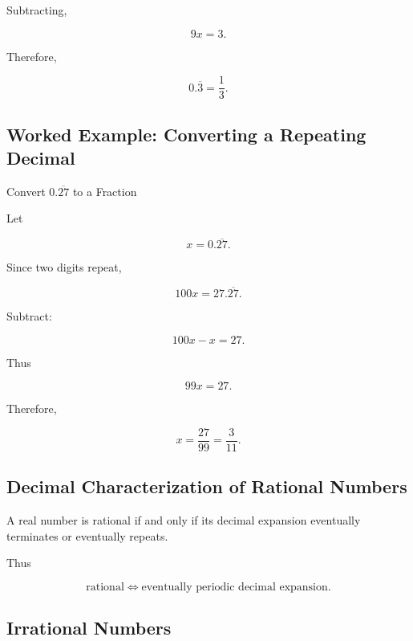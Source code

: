 Subtracting,

\[
9x=3.
\]

Therefore,

\[
\boxed{
0.\overline{3}
=
\frac13.
}
\]

\subsection{Worked Example: Converting a Repeating Decimal}
\label{subsec:worked-repeating-decimal}

\begin{workedexamplebox}{Convert \(0.\overline{27}\) to a Fraction}

Let

\[
x
=
0.\overline{27}.
\]

Since two digits repeat,

\[
100x
=
27.\overline{27}.
\]

Subtract:

\[
100x-x
=
27.
\]

Thus

\[
99x=27.
\]

Therefore,

\begin{answerbox}
\[
\boxed{
x
=
\frac{27}{99}
=
\frac{3}{11}.
}
\]
\end{answerbox}

\end{workedexamplebox}

\subsection{Decimal Characterization of Rational Numbers}
\label{subsec:rational-decimal-characterization}

A real number is rational if and only if its decimal expansion eventually
terminates or eventually repeats.

Thus

\[
\boxed{
\text{rational}
\iff
\text{eventually periodic decimal expansion}.
}
\]

\subsection{Irrational Numbers}
\label{subsec:irrational-numbers-reference}


